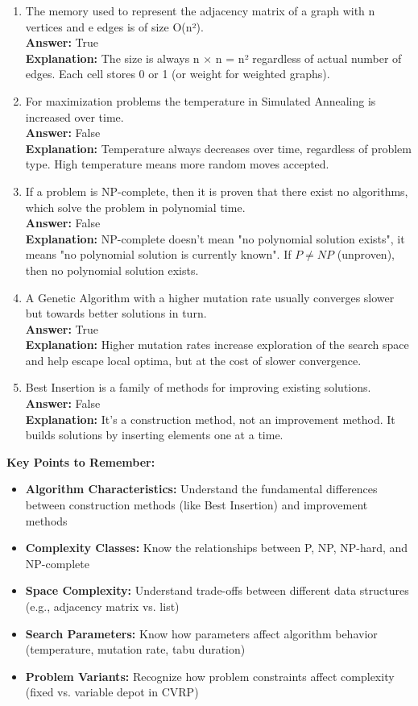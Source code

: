 \begin{enumerate}[label=\alph*)]
\item The memory used to represent the adjacency matrix of a graph with n vertices and e edges is of size O(n²).\\
\textbf{Answer:} True\\
\textbf{Explanation:} The size is always n × n = n² regardless of actual number of edges. Each cell stores 0 or 1 (or weight for weighted graphs).

\item For maximization problems the temperature in Simulated Annealing is increased over time.\\
\textbf{Answer:} False\\
\textbf{Explanation:} Temperature always decreases over time, regardless of problem type. High temperature means more random moves accepted.

\item If a problem is NP-complete, then it is proven that there exist no algorithms, which solve the problem in polynomial time.\\
\textbf{Answer:} False\\
\textbf{Explanation:} NP-complete doesn't mean "no polynomial solution exists", it means "no polynomial solution is currently known". If \(P \neq NP\) (unproven), then no polynomial solution exists.

\item A Genetic Algorithm with a higher mutation rate usually converges slower but towards better solutions in turn.\\
\textbf{Answer:} True\\
\textbf{Explanation:} Higher mutation rates increase exploration of the search space and help escape local optima, but at the cost of slower convergence.

\item Best Insertion is a family of methods for improving existing solutions.\\
\textbf{Answer:} False\\
\textbf{Explanation:} It's a construction method, not an improvement method. It builds solutions by inserting elements one at a time.

\end{enumerate}

\textbf{Key Points to Remember:}
\begin{itemize}
\item \textbf{Algorithm Characteristics:} Understand the fundamental differences between construction methods (like Best Insertion) and improvement methods
\item \textbf{Complexity Classes:} Know the relationships between P, NP, NP-hard, and NP-complete
\item \textbf{Space Complexity:} Understand trade-offs between different data structures (e.g., adjacency matrix vs. list)
\item \textbf{Search Parameters:} Know how parameters affect algorithm behavior (temperature, mutation rate, tabu duration)
\item \textbf{Problem Variants:} Recognize how problem constraints affect complexity (fixed vs. variable depot in CVRP)
\end{itemize}

